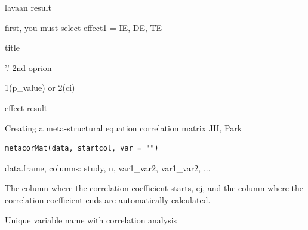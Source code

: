 \documentclass[a4paper]{book}
\begin{document}
%
\begin{Arguments}
\begin{ldescription}
\item[\code{x}] lavaan result

\item[\code{effect1}] first, you must select effect1 = IE, DE, TE

\item[\code{caption}] title

\item[\code{effect2}] '.' 2nd oprion

\item[\code{option}] 1(p\_value) or 2(ci)
\end{ldescription}
\end{Arguments}
%
\begin{Value}
effect result
\end{Value}
%
\begin{Description}
Creating a meta-structural equation correlation matrix JH, Park
\end{Description}
%
\begin{Usage}
\begin{verbatim}
metacorMat(data, startcol, var = "")
\end{verbatim}
\end{Usage}
%
\begin{Arguments}
\begin{ldescription}
\item[\code{data}] data.frame, columns:  study, n, var1\_var2, var1\_var2, ...

\item[\code{startcol}] The column where the correlation coefficient starts, ej, and the column where the correlation coefficient ends are automatically calculated.

\item[\code{var}] Unique variable name with correlation analysis
\end{ldescription}
\end{Arguments}
%
\end{document}
